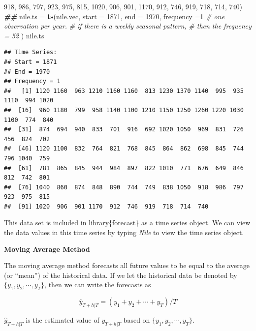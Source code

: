 \documentclass[
]{book}
\newenvironment{Shaded}{\begin{snugshade}}{\end{snugshade}}
\newcommand{\AttributeTok}[1]{\textcolor[rgb]{0.13,0.29,0.53}{#1}}
\newcommand{\CommentTok}[1]{\textcolor[rgb]{0.56,0.35,0.01}{\textit{#1}}}
\newcommand{\DecValTok}[1]{\textcolor[rgb]{0.00,0.00,0.81}{#1}}
\newcommand{\DocumentationTok}[1]{\textcolor[rgb]{0.56,0.35,0.01}{\textbf{\textit{#1}}}}
\newcommand{\FunctionTok}[1]{\textcolor[rgb]{0.13,0.29,0.53}{\textbf{#1}}}
\newcommand{\NormalTok}[1]{#1}
\newcommand{\OtherTok}[1]{\textcolor[rgb]{0.56,0.35,0.01}{#1}}
\begin{document}
\begin{Shaded}
\begin{Highlighting}[]
\DecValTok{918}\NormalTok{, }\DecValTok{986}\NormalTok{, }\DecValTok{797}\NormalTok{, }\DecValTok{923}\NormalTok{, }\DecValTok{975}\NormalTok{, }\DecValTok{815}\NormalTok{, }\DecValTok{1020}\NormalTok{, }\DecValTok{906}\NormalTok{, }\DecValTok{901}\NormalTok{, }\DecValTok{1170}\NormalTok{, }\DecValTok{912}\NormalTok{, }\DecValTok{746}\NormalTok{, }\DecValTok{919}\NormalTok{, }\DecValTok{718}\NormalTok{, }\DecValTok{714}\NormalTok{, }\DecValTok{740}\NormalTok{)}
\DocumentationTok{\#\#}
\NormalTok{nile.ts }\OtherTok{=} \FunctionTok{ts}\NormalTok{(nile.vec, }
             \AttributeTok{start =} \DecValTok{1871}\NormalTok{, }
             \AttributeTok{end =} \DecValTok{1970}\NormalTok{, }
             \AttributeTok{frequency =}\DecValTok{1}  \CommentTok{\# one observation per year. }
                           \CommentTok{\# if there is a weekly seasonal pattern,}
                           \CommentTok{\# then the frequency = 52}
\NormalTok{             )}
\NormalTok{ nile.ts}
\end{Highlighting}
\end{Shaded}

\begin{verbatim}
## Time Series:
## Start = 1871 
## End = 1970 
## Frequency = 1 
##   [1] 1120 1160  963 1210 1160 1160  813 1230 1370 1140  995  935 1110  994 1020
##  [16]  960 1180  799  958 1140 1100 1210 1150 1250 1260 1220 1030 1100  774  840
##  [31]  874  694  940  833  701  916  692 1020 1050  969  831  726  456  824  702
##  [46] 1120 1100  832  764  821  768  845  864  862  698  845  744  796 1040  759
##  [61]  781  865  845  944  984  897  822 1010  771  676  649  846  812  742  801
##  [76] 1040  860  874  848  890  744  749  838 1050  918  986  797  923  975  815
##  [91] 1020  906  901 1170  912  746  919  718  714  740
\end{verbatim}

This data set is included in library\{forecast\} as a time series object. We can view the data values in this time series by typing \emph{Nile} to view the time series object.

\textbf{Moving Average Method}

The moving average method forecasts all future values to be equal to the average (or ``mean'') of the historical data. If we let the historical data be denoted by \(\{y_1, y_2, \cdots, y_T \}\), then we can write the forecasts as

\[
\hat{y}_{T+h|T} = (y_1+y_2+\cdots+y_T)/T
\]

\(\hat{y}_{T+h|T}\) is the estimated value of \(y_{T+h|T}\) based on \(\{y_1, y_2, \cdots, y_T \}\).
\end{document}
